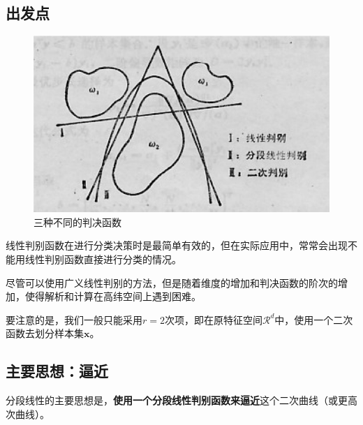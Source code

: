 \documentclass[12pt, letterpaper]{article}
\begin{document}
\subsection{出发点}

\begin{figure}
\centering
\includegraphics[scale=0.5]{三种判决函数.png}
\caption{三种不同的判决函数}
\end{figure}

线性判别函数在进行分类决策时是最简单有效的，但在实际应用中，常常会出现不能用线性判别函数直接进行分类的情况。

尽管可以使用广义线性判别的方法，但是随着维度的增加和判决函数的阶次的增加，使得解析和计算在高纬空间上遇到困难。

要注意的是，我们一般只能采用$r=2$次项，即在原特征空间$\mathscr{R}^d$中，使用一个二次函数去划分样本集${\mathbf{x}}$。


\subsection{主要思想：逼近}
分段线性的主要思想是，\textbf{使用一个分段线性判别函数来逼近}这个二次曲线（或更高次曲线）。
\end{document}
